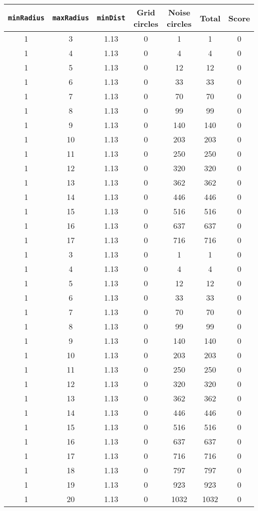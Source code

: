 \documentclass[letterpaper, 12pt]{article}
\begin{document}
\begin{longtable}{|c|c|c|c|c|c|c|}
\hline
\textbf{\texttt{minRadius}} & \textbf{\texttt{maxRadius}} & \textbf{\texttt{minDist}} & \textbf{Grid circles} & \textbf{Noise circles} & \textbf{Total} & \textbf{Score} \\
\hline
1 & 3 & 1.13 & 0 & 1 & 1 & 0 \\
\hline
1 & 4 & 1.13 & 0 & 4 & 4 & 0 \\
\hline
1 & 5 & 1.13 & 0 & 12 & 12 & 0 \\
\hline
1 & 6 & 1.13 & 0 & 33 & 33 & 0 \\
\hline
1 & 7 & 1.13 & 0 & 70 & 70 & 0 \\
\hline
1 & 8 & 1.13 & 0 & 99 & 99 & 0 \\
\hline
1 & 9 & 1.13 & 0 & 140 & 140 & 0 \\
\hline
1 & 10 & 1.13 & 0 & 203 & 203 & 0 \\
\hline
1 & 11 & 1.13 & 0 & 250 & 250 & 0 \\
\hline
1 & 12 & 1.13 & 0 & 320 & 320 & 0 \\
\hline
1 & 13 & 1.13 & 0 & 362 & 362 & 0 \\
\hline
1 & 14 & 1.13 & 0 & 446 & 446 & 0 \\
\hline
1 & 15 & 1.13 & 0 & 516 & 516 & 0 \\
\hline
1 & 16 & 1.13 & 0 & 637 & 637 & 0 \\
\hline
1 & 17 & 1.13 & 0 & 716 & 716 & 0 \\
\hline
1 & 3 & 1.13 & 0 & 1 & 1 & 0 \\
\hline
1 & 4 & 1.13 & 0 & 4 & 4 & 0 \\
\hline
1 & 5 & 1.13 & 0 & 12 & 12 & 0 \\
\hline
1 & 6 & 1.13 & 0 & 33 & 33 & 0 \\
\hline
1 & 7 & 1.13 & 0 & 70 & 70 & 0 \\
\hline
1 & 8 & 1.13 & 0 & 99 & 99 & 0 \\
\hline
1 & 9 & 1.13 & 0 & 140 & 140 & 0 \\
\hline
1 & 10 & 1.13 & 0 & 203 & 203 & 0 \\
\hline
1 & 11 & 1.13 & 0 & 250 & 250 & 0 \\
\hline
1 & 12 & 1.13 & 0 & 320 & 320 & 0 \\
\hline
1 & 13 & 1.13 & 0 & 362 & 362 & 0 \\
\hline
1 & 14 & 1.13 & 0 & 446 & 446 & 0 \\
\hline
1 & 15 & 1.13 & 0 & 516 & 516 & 0 \\
\hline
1 & 16 & 1.13 & 0 & 637 & 637 & 0 \\
\hline
1 & 17 & 1.13 & 0 & 716 & 716 & 0 \\
\hline
1 & 18 & 1.13 & 0 & 797 & 797 & 0 \\
\hline
1 & 19 & 1.13 & 0 & 923 & 923 & 0 \\
\hline
1 & 20 & 1.13 & 0 & 1032 & 1032 & 0 \\
\hline
\end{longtable}
\end{document}
